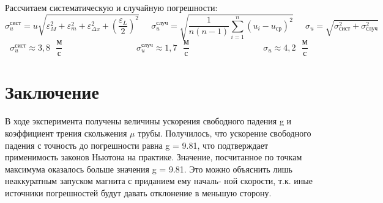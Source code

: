 \documentclass[
	a4paper, %
	12pt, %
]{article}
\begin{document}
	Рассчитаем систематическую и случайную погрешности:
	\begin{equation}
		\sigma_u^{\text{сист}} =u \sqrt{\varepsilon_M^2 + \varepsilon_m^2 + \varepsilon_{\Delta x}^2 + \left(\frac{\varepsilon_L}{2} \right)^2}  \;\;\;\;\; \sigma_u^{\text{случ}} = \sqrt{ \frac{1}{n(n-1)} \sum_{i=1}^{n}(u_i - u_{\text{ср}})^2} \;\;\;\;\; \sigma_u =\sqrt{\sigma_{\text{сист}}^2 + \sigma_\text{случ}^2} 
	\end{equation}
	\begin{equation}
		\sigma_u^\text{сист}\approx 3,8 \text{ }\dfrac{\text{м}}{\text{с}} \;\;\;\;\;\;\;\;\;\;\;\;\;\;\;\;\;\;\;\;\;\;\;\;\;\;\;\;\;\;\; \sigma_u^\text{случ}\approx 1,7 \text{ }\dfrac{\text{м}}{\text{с}} \;\;\;\;\;\;\;\;\;\;\;\;\;\;\;\;\;\;\;\;\;\;\;\;\;\;\;\;\;\;\;
		\sigma_u \approx 4,2 \text{ }\dfrac{\text{м}}{\text{с}}
	\end{equation}
	
	\section{Заключение}
	В ходе эксперимента получены величины ускорения свободного падения g и коэффициент трения скольжения $\mu$ трубы. Получилось, что ускорение свободного падения с точность до погрешности равна g = 9.81, что подтверждает применимость законов Ньютона на практике.
	Значение, посчитанное по точкам максимума оказалось больше значения g = 9.81.
	Это можно объяснить лишь неаккуратным запуском магнита с приданием ему началь-
	ной скорости, т.к. иные источники погрешностей будут давать отклонение в меньшую
	сторону.
	
	
\end{document}
